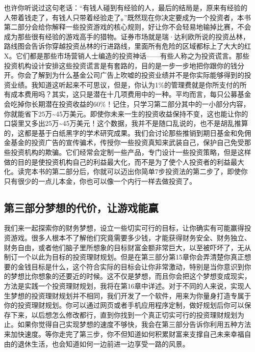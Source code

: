 也许你听说过这句老话：“有钱人碰到有经验的人，最后的结局是，原来有经验的人带着钱走了，有钱人只带着经验走了。”既然现在你决定要成为一个投资者，本书第二部分会给你解释一些投资游戏的核心规则，好让你不会轻易地输掉比赛，不会成为那些很有经验的游戏高手的猎物。证券市场就是瑞·达利欧所说的投资丛林，路线图会告诉你穿越投资丛林的行进路线，里面所有危险的区域都标上了大大的红X。它们都是那些市场营销人士编造的投资神话——有些人称之为投资谎言。那些投资机构设计安排这些投资谎言是有套路的，目的是一步一步地把你跟你的钱分开。你会了解到为什么基金公司广告上吹嘘的投资业绩并不是你实际能够得到的投资业绩。我知道这听起来不可思议，但是，你认为1\%的管理费就是你所支付的所有成本费用吗？其实，这只是潜在十几项费用中的一种。平均而言，每只公募基金会吃掉你长期潜在投资收益的60\%！记住，只学习第二部分其中的一小部分内容，你就能省下25万\textasciitilde{}45万美元。即使你未来一生的投资收益保持不变，这也能让你的口袋里又多出25万\textasciitilde{}45万美元！这个数据，我并不是随口乱说的，也不是胡乱推算的，这都是基于白纸黑字的学术研究成果。我们会讨论那些推销到期日基金和免佣金基金的投资广告的宣传骗术，传授你一些投资真知来武装自己，保护自己免受那些投资机构的欺骗。它们经常会定制一些产品，专门设计一些投资策略，但是这样做的目的是使投资机构自己的利益最大化，而不是为了使个人投资者的利益最大化。读完本书的第二部分后，你就可以迈出你简单7步投资法的第二步了，即使你只有很少的一点儿本金，你也可以像一个内行一样去做投资了。

\subsection{第三部分\q 梦想的代价，让游戏能赢}

我们来一起探索你的财务梦想，设立一些切实可行的目标，让你确实有可能赢得投资游戏。很多人根本不了解他们究竟需要多少钱，才能获得财务安全、财务独立、财务自由，或者他们脑子里所想象的目标财富金额非常巨大，以至被吓坏了，无从制订一个以此为目标的投资理财规划。但是在第三部分第15章你会弄清楚你真正想要的金钱目标是什么，这个符合实际的目标会让你非常激动，特别是当你意识到你的梦想比你想象的还要近的时候。这不仅是梦想，而且你会把这个梦想变成现实，方法是实践一个投资理财规划，我将在第16章中详述。对于不同的人来说，实现人生梦想的投资理财规划并不相同，我们开发了一个软件，用来为你量身打造专属于你的投资理财规划。你可以通过网页或者手机应用程序定制，做好规划后你可以保存下来，以后想怎么修改都行，直到你找到一个真正切实可行的投资理财规划为止。如果你觉得自己实现梦想的速度不够快，我会在第三部分告诉你利用五种方法来加快速度。等你走完了第三步，你不但知道如何积累财富来支撑自己未来幸福自由的退休生活，也会知道如何一边前进一边享受一路的风景。


